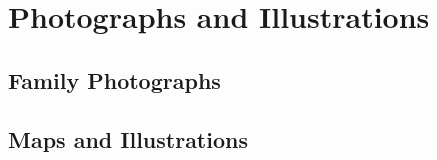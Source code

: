 \chapter{Photographs and Illustrations}

\section{Family Photographs}

\section{Maps and Illustrations}
